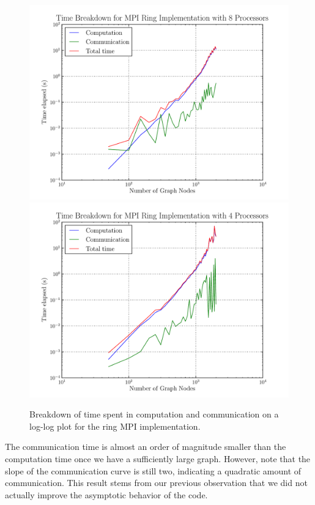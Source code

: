 \documentclass[12pt]{article}
\begin{document}
\begin{figure}
  \centering
  \includegraphics[scale=0.7]{../profiling/mpi_log_timing_8.pdf}
  \includegraphics[scale=0.7]{../profiling/mpi_log_timing_4.pdf}
  \caption{Breakdown of time spent in computation and communication on a
    log-log plot for the ring MPI implementation.}
\end{figure}

\vspace{0.75em}
\noindent The communication time is almost an order of magnitude smaller than the
computation time once we have a sufficiently large graph. However,
note that the slope of the communication curve is still two, indicating
a quadratic amount of communication. This result stems from our previous
observation that we did not actually improve the asymptotic behavior
of the code.
\end{document}
